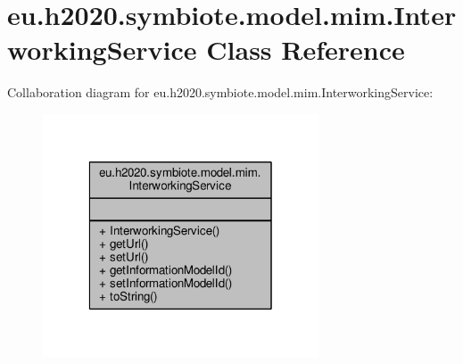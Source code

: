 \hypertarget{classeu_1_1h2020_1_1symbiote_1_1model_1_1mim_1_1InterworkingService}{}\section{eu.\+h2020.\+symbiote.\+model.\+mim.\+Interworking\+Service Class Reference}
\label{classeu_1_1h2020_1_1symbiote_1_1model_1_1mim_1_1InterworkingService}


Collaboration diagram for eu.\+h2020.\+symbiote.\+model.\+mim.\+Interworking\+Service\+:\nopagebreak
\begin{figure}[H]
\begin{center}
\leavevmode
\includegraphics[width=232pt]{classeu_1_1h2020_1_1symbiote_1_1model_1_1mim_1_1InterworkingService__coll__graph}
\end{center}
\end{figure}
